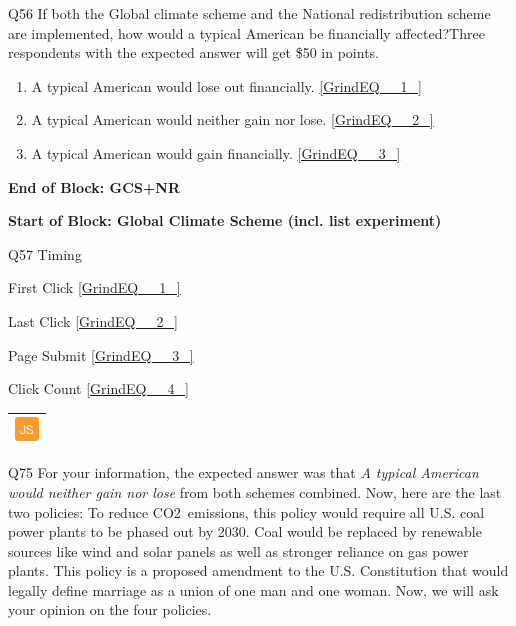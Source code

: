\documentclass{article} %
\begin{document}
\noindent 

\noindent 

\noindent 

\noindent Q56 If both the Global climate scheme and the National redistribution scheme are implemented, how would a typical American be financially affected?Three respondents with the expected answer will get \$50 in points.

\begin{enumerate}
\item  A typical American would lose out financially.  \eqref{GrindEQ__1_} 

\item  A typical American would neither gain nor lose.  \eqref{GrindEQ__2_} 

\item  A typical American would gain financially.  \eqref{GrindEQ__3_} 
\end{enumerate}

\noindent 

\noindent \textbf{End of Block: GCS+NR}

\noindent \textbf{}

\noindent \textbf{Start of Block: Global Climate Scheme (incl. list experiment)}

\noindent 

\noindent Q57 Timing

\noindent First Click  \eqref{GrindEQ__1_}

\noindent Last Click  \eqref{GrindEQ__2_}

\noindent Page Submit  \eqref{GrindEQ__3_}

\noindent Click Count  \eqref{GrindEQ__4_}

\noindent 

\noindent 

\begin{tabular}{|p{0.2in}|} \hline 
\includegraphics*[width=0.25in, height=0.25in]{image6} \\ \hline 
\end{tabular}



\noindent Q75 For your information, the expected answer was that \textit{A typical American would neither gain nor lose} from both schemes combined. Now, here are the last two policies:  \textbf{} To reduce CO2~emissions, this policy would require all U.S. coal power plants to be phased out by 2030. Coal would be replaced by renewable sources like wind and solar panels as well as stronger reliance on gas power plants.  \textbf{} This policy is a proposed amendment to the U.S. Constitution that would legally define marriage as a union of one man and one woman.  Now, we will ask your opinion on the four policies. 
\end{document}
